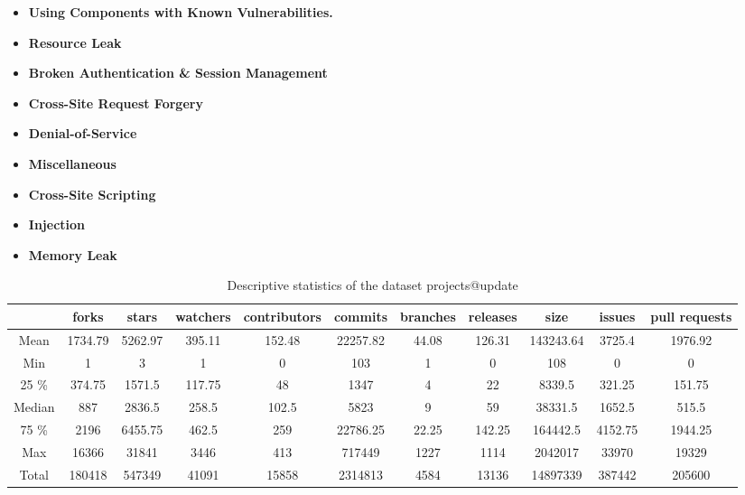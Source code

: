 \documentclass[10pt,conference]{IEEEtran}
\begin{document}
\begin{itemize}
	\item \textbf{Using Components with Known Vulnerabilities.} 
	\item \textbf{Resource Leak}
	\item \textbf{Broken Authentication \& Session Management}
	\item \textbf{Cross-Site Request Forgery}
	\item \textbf{Denial-of-Service}
	\item \textbf{Miscellaneous}
	\item \textbf{Cross-Site Scripting}
	\item \textbf{Injection}
	\item \textbf{Memory Leak}
\end{itemize}


\begin{table}[h]
\centering
\caption{Descriptive statistics of the dataset projects\textcolor{mypink3}{@update}} \label{tab:dataset}
\begin{tabular}{@{}ccccccccccc@{}}
\toprule
     & forks   & stars   & watchers & contributors & commits  & branches & releases & size      & issues  & pull requests \\ \midrule
Mean & 1734.79 & 5262.97 & 395.11   & 152.48       & 22257.82 & 44.08    & 126.31   & 143243.64 & 3725.4  & 1976.92       \\
Min     & 1       & 3       & 1        & 0            & 103      & 1        & 0        & 108       & 0       & 0             \\
25 \%     & 374.75  & 1571.5  & 117.75   & 48           & 1347     & 4        & 22       & 8339.5    & 321.25  & 151.75        \\
Median     & 887     & 2836.5  & 258.5    & 102.5        & 5823     & 9        & 59       & 38331.5   & 1652.5  & 515.5         \\
75 \%     & 2196    & 6455.75 & 462.5    & 259          & 22786.25 & 22.25    & 142.25   & 164442.5  & 4152.75 & 1944.25       \\
Max     & 16366   & 31841   & 3446     & 413          & 717449   & 1227     & 1114     & 2042017   & 33970   & 19329         \\
Total     & 180418  & 547349  & 41091    & 15858        & 2314813  & 4584     & 13136    & 14897339  & 387442  & 205600        \\ \bottomrule
\end{tabular}
\end{table}
\end{document}
